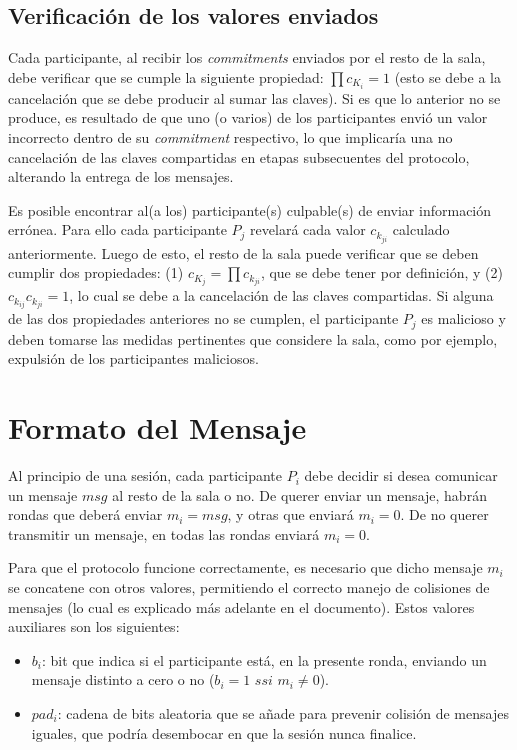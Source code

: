 \subsection{Verificación de los valores enviados}

Cada participante, al recibir los \emph{commitments} enviados por el resto de 
la sala, debe verificar que se cumple la siguiente propiedad: 
$\prod c_{K_i} = 1$ (esto se debe a la cancelación que se debe producir al 
sumar las claves). Si es que lo anterior no se produce, es resultado de que 
uno (o varios) de los participantes envió un valor incorrecto dentro de su 
\emph{commitment} respectivo, lo que implicaría una no cancelación de las 
claves compartidas en etapas subsecuentes del protocolo, alterando la entrega 
de los mensajes.

Es posible encontrar al(a los) participante(s) culpable(s) de enviar 
información errónea. Para ello cada participante $P_j$ revelará cada valor 
$c_{k_{ji}}$ calculado anteriormente. Luego de esto, el resto de la sala puede 
verificar que se deben cumplir dos propiedades: 
(1) $c_{K_j} = \prod c_{k_{ji}}$, que se debe tener por definición, y 
(2) $c_{k_{ij}} c_{k_{ji}} = 1$, lo cual se debe a la cancelación de las 
claves compartidas. Si alguna de las dos propiedades anteriores no se cumplen, 
el participante $P_j$ es malicioso y deben tomarse las medidas pertinentes que 
considere la sala, como por ejemplo, expulsión de los participantes maliciosos.

\section{Formato del Mensaje}

Al principio de una sesión, cada participante $P_i$ debe decidir si desea 
comunicar un mensaje $msg$ al resto de la sala o no. De querer enviar un 
mensaje, habrán rondas que deberá enviar $m_i = msg$, y otras que enviará 
$m_i = 0$. De no querer transmitir un mensaje, en todas las rondas enviará 
$m_i = 0$. 

Para que el protocolo funcione correctamente, es necesario que dicho mensaje 
$m_i$ se concatene con otros valores, permitiendo el correcto manejo de 
colisiones de mensajes (lo cual es explicado más adelante en el documento). 
Estos valores auxiliares son los siguientes:
\begin{itemize}
    \item $b_i$: bit que indica si el participante está, en la presente ronda, 
    enviando un mensaje distinto a cero o no ($b_i = 1\,\, ssi\,\, m_i \neq 0$).
    \item $pad_i$: cadena de bits aleatoria que se añade para prevenir 
    colisión de mensajes iguales, que podría desembocar en que la sesión nunca 
    finalice.
\end{itemize}


